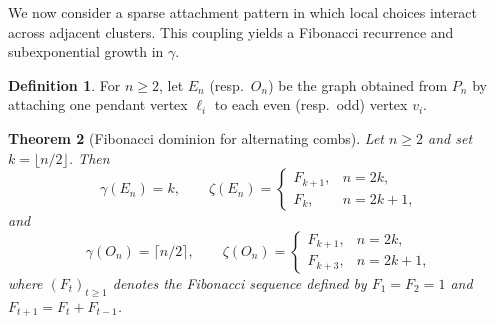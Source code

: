 \documentclass[11pt]{article}
\newtheorem{theorem}{Theorem}
\theoremstyle{definition}
\newtheorem{definition}[theorem]{Definition}
\theoremstyle{remark}
\begin{document}
We now consider a sparse attachment pattern in which local choices interact across adjacent clusters.
This coupling yields a Fibonacci recurrence and subexponential growth in $\gamma$.

\begin{definition}
For $n\ge 2$, let $E_n$ (resp.\ $O_n$) be the graph obtained from $P_n$ by attaching one pendant vertex
$\ell_i$ to each even (resp.\ odd) vertex $v_i$.
\end{definition}

\begin{theorem}[Fibonacci dominion for alternating combs]\label{thm:alt}
Let $n\ge 2$ and set $k=\lfloor n/2\rfloor$. Then
\[
\gamma(E_n)=k,\qquad
\zeta(E_n)=
\begin{cases}
F_{k+1},& n=2k,\\
F_k,& n=2k+1,
\end{cases}
\]
and
\[
\gamma(O_n)=\lceil n/2\rceil,\qquad
\zeta(O_n)=
\begin{cases}
F_{k+1},& n=2k,\\
F_{k+3},& n=2k+1,
\end{cases}
\]
where $(F_t)_{t\ge1}$ denotes the Fibonacci sequence defined by $F_1=F_2=1$ and
$F_{t+1}=F_t+F_{t-1}$.
\end{theorem}
\end{document}
